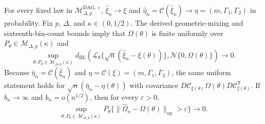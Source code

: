 For every fixed law in \(\mathcal M_{\Delta,p}^{\mathrm{DAG},+}\), \(\widehat\xi_n\to\xi\) and \(\widehat\eta_n=\mathcal C(\widehat\xi_n)\to\eta=(m,\Gamma_1,\Gamma_2)\) in probability. Fix \(p\), \(\Delta\), and \(\kappa\in(0,1/2)\). The derived geometric-mixing and sixteenth-bin-count bounds imply that \(\Omega(\theta)\) is finite uniformly over \(P_{\theta}\in\mathcal M_{\Delta,p}(\kappa)\) and \[\sup_{\theta:P_{\theta}\in\mathcal M_{\Delta,p}(\kappa)}d_{\mathrm{BL}}\left(\mathcal L_{\theta}\{\sqrt n(\widehat\xi_n-\xi(\theta))\},\mathcal N\{0,\Omega(\theta)\}\right)\longrightarrow0.\] Because \(\widehat\eta_n=\mathcal C(\widehat\xi_n)\) and \(\eta=\mathcal C(\xi)=(m,\Gamma_1,\Gamma_2)\), the same uniform statement holds for \(\sqrt n(\widehat\eta_n-\eta(\theta))\) with covariance \(D\mathcal C_{\xi(\theta)}\Omega(\theta)D\mathcal C_{\xi(\theta)}^{\mathsf T}\). If \(b_n\to\infty\) and \(b_n=o(n^{1/2})\), then for every \(\varepsilon>0\), \[\sup_{\theta:P_{\theta}\in\mathcal M_{\Delta,p}(\kappa)}P_{\theta}\{\lVert\widehat\Omega_n-\Omega(\theta)\rVert_{\mathrm{op}}>\varepsilon\}\longrightarrow0.\]
